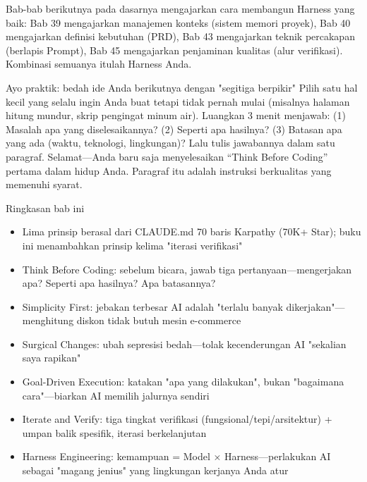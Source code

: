 Bab-bab berikutnya pada dasarnya mengajarkan cara membangun Harness yang baik: Bab 39 mengajarkan manajemen konteks (sistem memori proyek), Bab 40 mengajarkan definisi kebutuhan (PRD), Bab 43 mengajarkan teknik percakapan (berlapis Prompt), Bab 45 mengajarkan penjaminan kualitas (alur verifikasi). Kombinasi semuanya itulah Harness Anda.

\begin{tcbpractice}{Ayo praktik: bedah ide Anda berikutnya dengan "segitiga berpikir"}
Pilih satu hal kecil yang selalu ingin Anda buat tetapi tidak pernah mulai (misalnya halaman hitung mundur, skrip pengingat minum air). Luangkan 3 menit menjawab: (1) Masalah apa yang diselesaikannya? (2) Seperti apa hasilnya? (3) Batasan apa yang ada (waktu, teknologi, lingkungan)? Lalu tulis jawabannya dalam satu paragraf. Selamat—Anda baru saja menyelesaikan “Think Before Coding” pertama dalam hidup Anda. Paragraf itu adalah instruksi berkualitas yang memenuhi syarat.

\end{tcbpractice}

\begin{tcbsummary}{Ringkasan bab ini}
\begin{itemize}
  \item Lima prinsip berasal dari CLAUDE.md 70 baris Karpathy (70K+ Star); buku ini menambahkan prinsip kelima "iterasi verifikasi"
  \item Think Before Coding: sebelum bicara, jawab tiga pertanyaan—mengerjakan apa? Seperti apa hasilnya? Apa batasannya?
  \item Simplicity First: jebakan terbesar AI adalah "terlalu banyak dikerjakan"—menghitung diskon tidak butuh mesin e-commerce
  \item Surgical Changes: ubah sepresisi bedah—tolak kecenderungan AI "sekalian saya rapikan"
  \item Goal-Driven Execution: katakan "apa yang dilakukan", bukan "bagaimana cara"—biarkan AI memilih jalurnya sendiri
  \item Iterate and Verify: tiga tingkat verifikasi (fungsional/tepi/arsitektur) + umpan balik spesifik, iterasi berkelanjutan
  \item Harness Engineering: kemampuan = Model × Harness—perlakukan AI sebagai "magang jenius" yang lingkungan kerjanya Anda atur
\end{itemize}

\end{tcbsummary}
